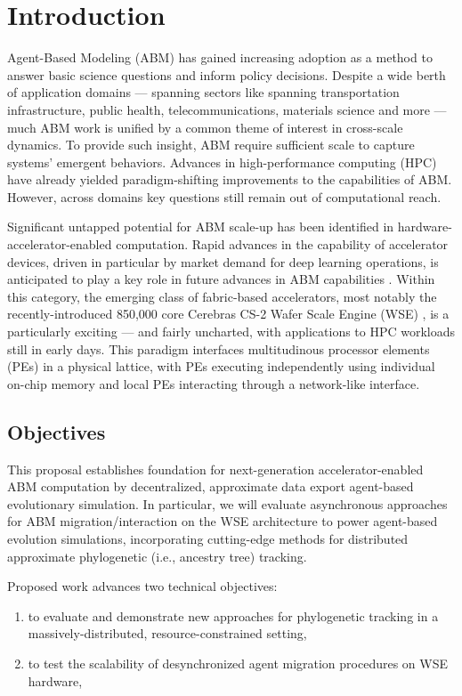 \section{Introduction} \label{sec:introduction}

Agent-Based Modeling (ABM) has gained increasing adoption as a method to answer basic science questions and inform policy decisions.
Despite a wide berth of application domains --- spanning sectors like spanning transportation infrastructure, public health, telecommunications, materials science and more --- much ABM work is unified by a common theme of interest in cross-scale dynamics.
To provide such insight, ABM require sufficient scale to capture systems' emergent behaviors.
Advances in high-performance computing (HPC) have already yielded paradigm-shifting improvements to the capabilities of ABM.
However, across domains key questions still remain out of computational reach.

Significant untapped potential for ABM scale-up has been identified in hardware-accelerator-enabled computation.
Rapid advances in the capability of accelerator devices, driven in particular by market demand for deep learning operations, is anticipated to play a key role in future advances in ABM capabilities \citep{deptofenergyTODO}.
Within this category, the emerging class of fabric-based accelerators, most notably the recently-introduced 850,000 core Cerebras CS-2 Wafer Scale Engine (WSE) \citep{lauterbach2021path,lie2022cerebras}, is a particularly exciting --- and fairly uncharted, with applications to HPC workloads still in early days.
This paradigm interfaces multitudinous processor elements (PEs) in a physical lattice, with PEs executing independently using individual on-chip memory and local PEs interacting through a network-like interface.

\subsection{Objectives}

This proposal establishes foundation for next-generation accelerator-enabled ABM computation by  decentralized, approximate data export  agent-based evolutionary simulation.
In particular, we will evaluate asynchronous approaches for ABM migration/interaction on the WSE architecture to power agent-based evolution simulations, incorporating cutting-edge methods for distributed approximate phylogenetic (i.e., ancestry tree) tracking.

Proposed work advances two technical objectives:
\begin{enumerate}
\item to evaluate and demonstrate new approaches for phylogenetic tracking in a massively-distributed, resource-constrained setting,
\item to test the scalability of desynchronized agent migration procedures on WSE hardware,
\end{enumerate}

